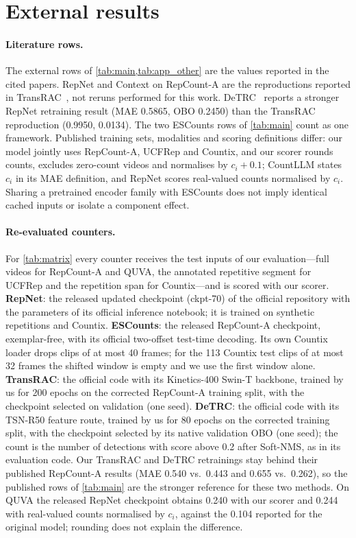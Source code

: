 \appendix

\section{External results}
\label{app:provenance}
\paragraph{Literature rows.} The external rows of \cref{tab:main,tab:app_other}
are the values reported in the cited papers. RepNet and Context on RepCount-A are
the reproductions reported in TransRAC~\cite{hu2022transrac}, not reruns performed
for this work. DeTRC~\cite{ma2026detrc} reports a stronger RepNet retraining result
(MAE 0.5865, OBO 0.2450) than the TransRAC reproduction (0.9950, 0.0134). The two
ESCounts rows of \cref{tab:main} count as one framework. Published training sets,
modalities and scoring definitions differ: our model jointly uses RepCount-A,
UCFRep and Countix, and our scorer rounds counts, excludes zero-count videos and
normalises by $c_i+0.1$; CountLLM states $c_i$ in its MAE definition, and RepNet
scores real-valued counts normalised by $c_i$. Sharing a pretrained encoder family
with ESCounts does not imply identical cached inputs or isolate a component effect.

\paragraph{Re-evaluated counters.} For \cref{tab:matrix} every counter receives the
test inputs of our evaluation---full videos for RepCount-A and QUVA, the annotated
repetitive segment for UCFRep and the repetition span for Countix---and is scored
with our scorer.
\textbf{RepNet}: the released updated checkpoint (ckpt-70) of the official
repository with the parameters of its official inference notebook; it is trained on
synthetic repetitions and Countix.
\textbf{ESCounts}: the released RepCount-A checkpoint, exemplar-free, with its
official two-offset test-time decoding. Its own Countix loader drops clips of at
most 40 frames; for the 113 Countix test clips of at most 32 frames the shifted
window is empty and we use the first window alone.
\textbf{TransRAC}: the official code with its Kinetics-400 Swin-T backbone,
trained by us for 200 epochs on the corrected RepCount-A training split, with the
checkpoint selected on validation (one seed).
\textbf{DeTRC}: the official code with its TSN-R50 feature route, trained by us for
80 epochs on the corrected training split, with the checkpoint selected by its
native validation OBO (one seed); the count is the number of detections with score
above 0.2 after Soft-NMS, as in its evaluation code.
Our TransRAC and DeTRC retrainings stay behind their published RepCount-A results
(MAE 0.540 vs.\ 0.443 and 0.655 vs.\ 0.262), so the published rows of
\cref{tab:main} are the stronger reference for these two methods. On QUVA the
released RepNet checkpoint obtains 0.240 with our scorer and 0.244 with real-valued
counts normalised by $c_i$, against the 0.104 reported for the original model;
rounding does not explain the difference.

